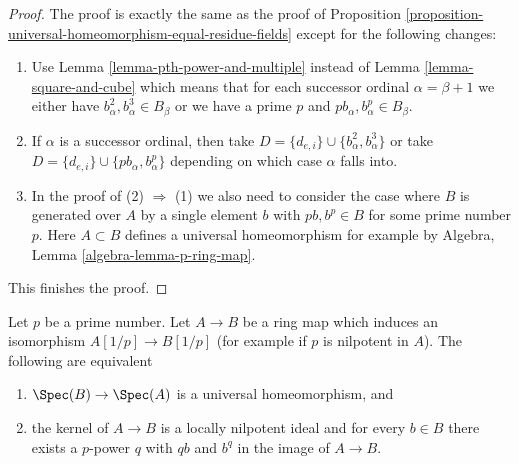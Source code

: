 \begin{proof}
The proof is exactly the same as the proof of
Proposition \ref{proposition-universal-homeomorphism-equal-residue-fields}
except for the following changes:
\begin{enumerate}
\item Use Lemma \ref{lemma-pth-power-and-multiple} instead of
Lemma \ref{lemma-square-and-cube} which means that for each successor
ordinal $\alpha = \beta + 1$ we either have
$b_\alpha^2, b_\alpha^3 \in B_\beta$ or we have a prime $p$ and
$pb_\alpha, b_\alpha^p \in B_\beta$.
\item If $\alpha$ is a successor ordinal, then take
$D = \{d_{e, i}\} \cup \{b_\alpha^2, b_\alpha^3\}$ or
take $D = \{d_{e, i}\} \cup \{pb_\alpha, b_\alpha^p\}$ depending
on which case $\alpha$ falls into.
\item In the proof of (2) $\Rightarrow$ (1) we also need to consider
the case where $B$ is generated over $A$ by a single element $b$
with $pb, b^p \in B$ for some prime number $p$. Here $A \subset B$
defines a universal homeomorphism for example by
Algebra, Lemma \ref{algebra-lemma-p-ring-map}.
\end{enumerate}
This finishes the proof.
\end{proof}

\begin{lemma}
\label{lemma-universal-homeo-iso-if-invert-p}
Let $p$ be a prime number. Let $A \to B$ be a ring map
which induces an isomorphism $A[1/p] \to B[1/p]$
(for example if $p$ is nilpotent in $A$).
The following are equivalent
\begin{enumerate}
\item $\Spec(B) \to \Spec(A)$ is a universal homeomorphism, and
\item the kernel of $A \to B$ is a locally nilpotent ideal and
for every $b \in B$ there exists a $p$-power $q$ with $qb$ and $b^q$
in the image of $A \to B$.
\end{enumerate}
\end{lemma}

